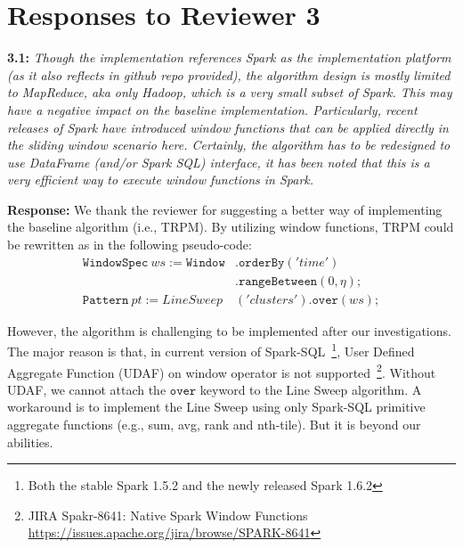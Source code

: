 \section{Responses to Reviewer 3}
\textbf{3.1:} \emph{Though the implementation references Spark as the implementation
platform (as it also reflects in github repo provided), the algorithm design is
mostly limited to MapReduce, aka only Hadoop, which is a very small subset of
Spark. This may have a negative impact on the baseline implementation.
Particularly, recent releases of Spark have introduced window functions that can
be applied directly in the sliding window scenario here. Certainly, the algorithm
has to be redesigned to use DataFrame (and/or Spark SQL) interface, it has
been noted that this is a very efficient way to execute window functions in
Spark.}

\textbf{Response:}
We thank the reviewer for suggesting a better way of implementing 
the baseline algorithm (i.e., TRPM). By utilizing window functions,
TRPM could be rewritten as in the following pseudo-code:
\begin{equation*}
\begin{aligned}
 \mathtt{WindowSpec}\ ws := \mathtt{Window}&.\mathtt{orderBy}('time') \\
 				&.\mathtt{rangeBetween}(0, \eta); \\
 \mathtt{Pattern}\ pt :=  LineSweep&('clusters').\mathtt{over}(ws); 
\end{aligned}
\end{equation*}

However, the algorithm is challenging
to be implemented after our investigations. The major reason is
that, in current version of Spark-SQL~\footnote{Both the stable Spark 1.5.2 and the newly released Spark 1.6.2}, 
User Defined Aggregate Function (UDAF) on window operator is not supported~\footnote{JIRA Spakr-8641: Native Spark Window Functions \url{https://issues.apache.org/jira/browse/SPARK-8641}}. 
Without UDAF, we cannot attach the $\mathtt{over}$ keyword to
the Line Sweep algorithm. A workaround is to implement the Line Sweep using only Spark-SQL primitive aggregate 
functions (e.g., sum, avg, rank and nth-tile). But it
is beyond our abilities.
%

